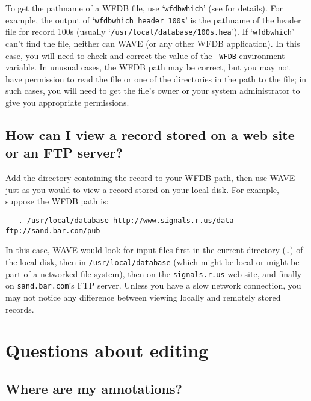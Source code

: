 \documentclass[twoside]{book}
\newcommand{\WAVE}{{\sf WAVE}\xspace}
\begin{document}
To get the pathname of a WFDB file, use `{\tt wfdbwhich}' (see
for details).  For example, the output of `{\tt wfdbwhich
header 100s}' is the pathname of the header file for record 100s
(usually `{\tt /usr/local/database/100s.hea}').  If `{\tt wfdbwhich}'
can't find the file, neither can \WAVE{} (or any other WFDB application).
In this case, you will need to check and correct the value of the {\tt
WFDB} environment variable.  In unusual cases, the WFDB path may be
correct, but you may not have permission to read the file or one of
the directories in the path to the file; in such cases, you will need
to get the file's owner or your system administrator to give you
appropriate permissions.

\subsection{How can I view a record stored on a web site or an FTP server?}

Add the directory containing the record to your WFDB path, then use \WAVE{}
just as you would to view a record stored on your local disk.  For example,
suppose the WFDB path is:
\begin{verbatim}
   . /usr/local/database http://www.signals.r.us/data ftp://sand.bar.com/pub
\end{verbatim}
In this case, \WAVE{} would look for input files first in the current directory
({\tt .}) of the local disk, then in {\tt /usr/local/database} (which might be
local or might be part of a networked file system), then on the
{\tt signals.r.us} web site, and finally on {\tt sand.bar.com}'s FTP server.
Unless you have a slow network connection, you may not notice any difference
between viewing locally and remotely stored records.

\section{Questions about editing}

\subsection{Where are my annotations?}

\end{document}
